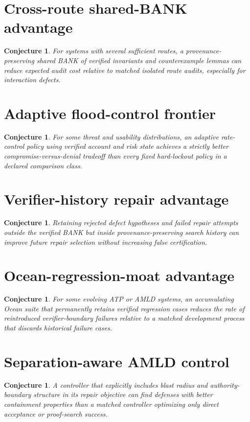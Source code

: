 \documentclass[11pt,oneside]{book}
\newtheorem{conjecture}[theorem]{Conjecture}
\theoremstyle{definition}
\theoremstyle{remark}
\begin{document}
\section{Cross-route shared-BANK advantage}
\begin{conjecture}
For systems with several sufficient routes, a provenance-preserving shared BANK of verified invariants and counterexample lemmas can reduce expected audit cost relative to matched isolated route audits, especially for interaction defects.
\end{conjecture}

\section{Adaptive flood-control frontier}
\begin{conjecture}
For some threat and usability distributions, an adaptive rate-control policy using verified account and risk state achieves a strictly better compromise-versus-denial tradeoff than every fixed hard-lockout policy in a declared comparison class.
\end{conjecture}

\section{Verifier-history repair advantage}
\begin{conjecture}
Retaining rejected defect hypotheses and failed repair attempts outside the verified BANK but inside provenance-preserving search history can improve future repair selection without increasing false certification.
\end{conjecture}

\section{Ocean-regression-moat advantage}
\begin{conjecture}
For some evolving ATP or AMLD systems, an accumulating Ocean suite that permanently retains verified regression cases reduces the rate of reintroduced verifier-boundary failures relative to a matched development process that discards historical failure cases.
\end{conjecture}

\section{Separation-aware AMLD control}
\begin{conjecture}
A controller that explicitly includes blast radius and authority-boundary structure in its repair objective can find defenses with better containment properties than a matched controller optimizing only direct acceptance or proof-search success.
\end{conjecture}
\end{document}
